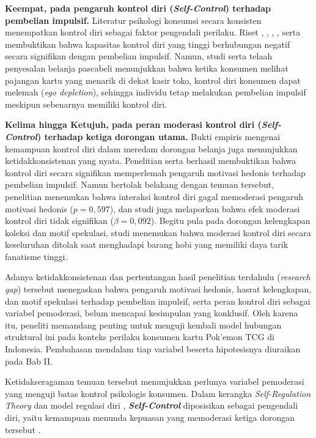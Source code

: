 \documentclass[12pt,a4paper]{article}
\numberwithin{equation}{section}
\numberwithin{table}{section}
\numberwithin{figure}{section}
\begin{document}
\textbf{Keempat, pada pengaruh kontrol diri (\emph{Self-Control}) terhadap pembelian impulsif.} Literatur psikologi konsumsi secara konsisten menempatkan kontrol diri sebagai faktor pengendali perilaku. Riset \citet{baumeister2002yield}, \citet{tangney2004high}, \citet{rafael2023intellectual}, \citet{prihatiningrum2021effect}, serta \citet{jain2023selfcontrol} membuktikan bahwa kapasitas kontrol diri yang tinggi berhubungan negatif secara signifikan dengan pembelian impulsif. Namun, studi \citet{widyastuti2024power} serta telaah penyesalan belanja pascabeli \citep{lubis2022evaluation} menunjukkan bahwa ketika konsumen melihat pajangan kartu yang menarik di dekat kasir toko, kontrol diri konsumen dapat melemah (\emph{ego depletion}), sehingga individu tetap melakukan pembelian impulsif meskipun sebenarnya memiliki kontrol diri.

\textbf{Kelima hingga Ketujuh, pada peran moderasi kontrol diri (\emph{Self-Control}) terhadap ketiga dorongan utama.} Bukti empiris mengenai kemampuan kontrol diri dalam meredam dorongan belanja juga menunjukkan ketidakkonsistenan yang nyata. Penelitian \citet{lienardy2026role} serta \citet{katauke2023financial} berhasil membuktikan bahwa kontrol diri secara signifikan memperlemah pengaruh motivasi hedonis terhadap pembelian impulsif. Namun bertolak belakang dengan temuan tersebut, penelitian \citet{apidana2022peran} menemukan bahwa interaksi kontrol diri gagal memoderasi pengaruh motivasi hedonis ($p = 0{,}597$), dan studi \citet{artadita2024how} juga melaporkan bahwa efek moderasi kontrol diri tidak signifikan ($\beta = 0{,}092$). Begitu pula pada dorongan kelengkapan koleksi dan motif spekulasi, studi \citet{artadita2024how} menemukan bahwa moderasi kontrol diri secara keseluruhan ditolak saat menghadapi barang hobi yang memiliki daya tarik fanatisme tinggi.

Adanya ketidakkonsistenan dan pertentangan hasil penelitian terdahulu (\emph{research gap}) tersebut menegaskan bahwa pengaruh motivasi hedonis, hasrat kelengkapan, dan motif spekulasi terhadap pembelian impulsif, serta peran kontrol diri sebagai variabel pemoderasi, belum mencapai kesimpulan yang konklusif. Oleh karena itu, peneliti memandang penting untuk menguji kembali model hubungan struktural ini pada konteks perilaku konsumen kartu Pok'emon TCG di Indonesia. Pembahasan mendalam tiap variabel beserta hipotesisnya diuraikan pada Bab II.

Ketidakseragaman temuan tersebut menunjukkan perlunya variabel pemoderasi yang menguji batas kontrol psikologis konsumen. Dalam kerangka \emph{Self-Regulation Theory} \citep{baumeister2002yield, rafael2023intellectual} dan model regulasi diri \citep{baumeister2024selfcontrol}, \textbf{\emph{Self-Control}} diposisikan sebagai pengendali diri, yaitu kemampuan menunda kepuasan \citep{tangney2004high, prihatiningrum2021effect, jain2023selfcontrol} yang memoderasi ketiga dorongan tersebut \citep{lienardy2026role}.
\end{document}
